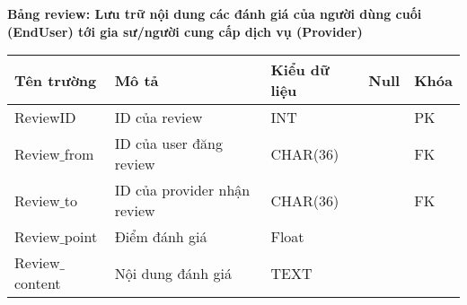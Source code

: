\documentclass[12pt,a4paper]{report}
\begin{document}
\textbf{Bảng  review: Lưu trữ nội dung các đánh giá của người dùng cuối (EndUser) tới gia sư/người cung cấp dịch vụ (Provider)}

\begin{center}
\begin{tabular}{|>{\raggedright\arraybackslash}m{3.5cm}|>{\raggedright\arraybackslash}m{5cm}|>{\raggedright\arraybackslash}m{3.6cm}| >{\centering\arraybackslash}m{1cm}| >{\centering\arraybackslash}m{1cm}|}
\hline 
\textbf{Tên trường} & \textbf{Mô tả} & \textbf{Kiểu dữ liệu} & \textbf{Null} & \textbf{Khóa} \\ 
\hline 
ReviewID & ID của review & INT &  & PK \\ 
\hline 
Review$\_$from & ID của user đăng review & CHAR(36) &  & FK \\ 
\hline 
Review$\_$to & ID của provider nhận review & CHAR(36) &  & FK \\ 
\hline 
Review$\_$point & Điểm đánh giá & Float &  &  \\ 
\hline 
Review$\_$content & Nội dung đánh giá & TEXT &  &  \\ 
\hline 
\end{tabular} 
\end{center}
\end{document}
